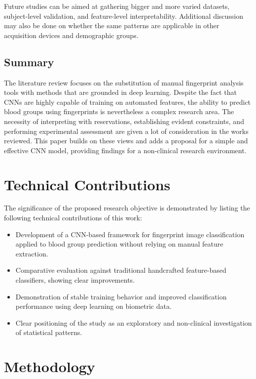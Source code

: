 \documentclass[conference]{IEEEtran}
\begin{document}
Future studies can be aimed at gathering bigger and more varied datasets, subject-level validation, and feature-level interpretability. Additional discussion may also be done on whether the same patterns are applicable in other acquisition devices and demographic groups.

\subsection{Summary}
The literature review focuses on the substitution of manual fingerprint analysis tools with methods that are grounded in deep learning. Despite the fact that CNNs are highly capable of training on automated features, the ability to predict blood groups using fingerprints is nevertheless a complex research area. The necessity of interpreting with reservations, establishing evident constraints, and performing experimental assessment are given a lot of consideration in the works reviewed. This paper builds on these views and adds a proposal for a simple and effective CNN model, providing findings for a non-clinical research environment.

\section{Technical Contributions}
The significance of the proposed research objective is demonstrated by listing the following technical contributions of this work:
\begin{itemize}
    \item Development of a CNN-based framework for fingerprint image classification applied to blood group prediction without relying on manual feature extraction.
    \item Comparative evaluation against traditional handcrafted feature-based classifiers, showing clear improvements.
    \item Demonstration of stable training behavior and improved classification performance using deep learning on biometric data.
    \item Clear positioning of the study as an exploratory and non-clinical investigation of statistical patterns.
\end{itemize}

\section{Methodology}
\end{document}
